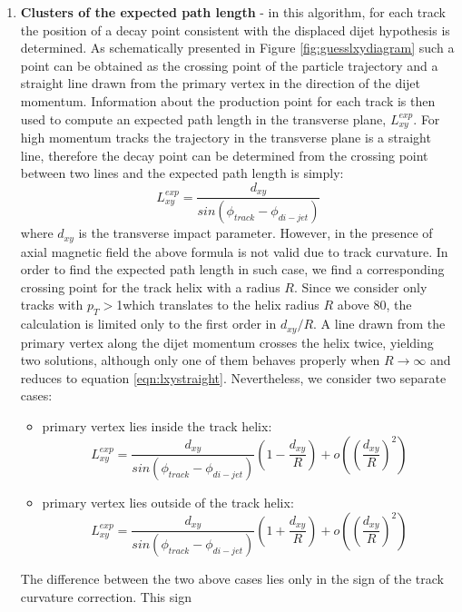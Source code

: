 \begin{enumerate}
\item{\bf Clusters of the expected path length}  
\label{subsec:Clusters}
- in this algorithm, for each track the position of a decay point consistent 
with the displaced dijet hypothesis 
is determined. As schematically presented in Figure 
\ref{fig:guesslxydiagram} such a point 
 can be obtained as the crossing point of   
the particle trajectory and a straight line drawn from the primary vertex in the direction of the dijet momentum.  
Information about the production point for each track is then used to compute an expected path length in the
transverse plane, $L_{xy}^{exp}$.  
For high momentum tracks the trajectory in the transverse plane is a straight line,
 therefore the decay point can be determined from the crossing point between two lines
 and the expected path length is simply:
\begin{equation}
 L_{xy}^{exp}=\frac{d_{xy}}{sin(\phi_{track} - \phi_{di-jet})}
\label{eqn:lxystraight}
\end{equation}
where $d_{xy}$ is the transverse impact parameter. However, in the presence of axial magnetic field 
the above formula is not valid due to track curvature. In order to find the expected path length in such case,
 we find a corresponding crossing point for the track helix with a radius $R$. Since we consider only
tracks with $p_T>$1\GeVc which translates to the helix radius $R$ above 80\cm, 
the calculation is limited only to the first order in 
$d_{xy}/R$. 
 A line drawn from the primary vertex along the dijet momentum crosses the helix twice, yielding
 two solutions, although only one of them behaves properly when $R\rightarrow\infty$ 
and reduces to equation \ref{eqn:lxystraight}. Nevertheless, we consider two  
separate cases:
\begin{itemize}
 \item primary vertex lies inside the track helix:
\begin{equation}
 L_{xy}^{exp} = \frac{d_{xy}}{sin(\phi_{track} - \phi_{di-jet})} (1 - \frac{d_{xy}}{R}) + o((\frac{d_{xy}}{R})^2)
\end{equation} 
 \item primary vertex lies outside of the track helix:
\begin{equation}
 L_{xy}^{exp} = \frac{d_{xy}}{sin(\phi_{track} - \phi_{di-jet})} (1 + \frac{d_{xy}}{R}) + o((\frac{d_{xy}}{R})^2)
\end{equation} 
\end{itemize}
The difference between the two above cases lies only in the sign of the track curvature correction. This sign

\end{enumerate}
